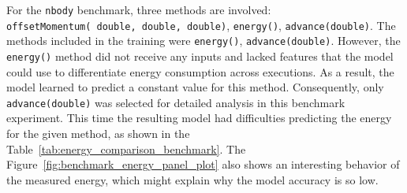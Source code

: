 {\color{blue}For the \texttt{nbody} benchmark, three methods are involved: \texttt{offsetMomentum(\allowbreak\ double,\allowbreak\ double,\allowbreak\ double)},
\texttt{energy()}, \texttt{advance(double)}. The methods included in the training were \texttt{energy()}, \texttt{advance(double)}. However, the \texttt{energy()} method did not receive any inputs and lacked features that the model could use to differentiate energy consumption across executions. As a result, the model learned to predict a constant value for this method. Consequently, only \texttt{advance(double)} was selected for detailed analysis in this benchmark experiment.}
This time the resulting model had difficulties predicting the energy for the given method, as shown in the Table~\ref{tab:energy_comparison_benchmark}. The Figure~\ref{fig:benchmark_energy_panel_plot} also shows an interesting behavior of the measured energy, which might explain why the model accuracy is so low.


\begin{table}[htbp]
  \centering
  \footnotesize
  \setlength{\tabcolsep}{10pt} 
  \caption{Comparison of actual and predicted energy consumption for nBody, fannkuch and spectralnorm program}
  \label{tab:energy_comparison_benchmark}
\end{table}


